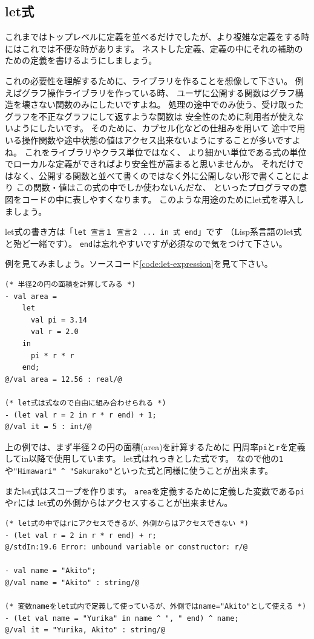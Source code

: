 \documentclass[11pt,a4paper]{article}
\begin{document}
\subsection{let式}
これまではトップレベルに定義を並べるだけでしたが、より複雑な定義をする時にはこれでは不便な時があります。
ネストした定義、定義の中にそれの補助のための定義を書けるようにしましょう。

これの必要性を理解するために、ライブラリを作ることを想像して下さい。
例えばグラフ操作ライブラリを作っている時、
ユーザに公開する関数はグラフ構造を壊さない関数のみにしたいですよね。
処理の途中でのみ使う、受け取ったグラフを不正なグラフにして返すような関数は
安全性のために利用者が使えないようにしたいです。
そのために、カプセル化などの仕組みを用いて
途中で用いる操作関数や途中状態の値はアクセス出来ないようにすることが多いですよね。
これをライブラリやクラス単位ではなく、
より細かい単位である式の単位でローカルな定義ができればより安全性が高まると思いませんか。
それだけではなく、公開する関数と並べて書くのではなく外に公開しない形で書くことにより
この関数・値はこの式の中でしか使わないんだな、
といったプログラマの意図をコードの中に表しやすくなります。
このような用途のためにlet式を導入しましょう。

let式の書き方は「\lstinline{let 宣言１ 宣言２ ... in 式 end}」です
（Lisp系言語のlet式と殆ど一緒です）。
\lstinline{end}は忘れやすいですが必須なので気をつけて下さい。

例を見てみましょう。ソースコード\ref{code:let-expression}を見て下さい。

\begin{lstlisting}[caption=let式,label=code:let-expression]
(* 半径2の円の面積を計算してみる *)
- val area =
    let
      val pi = 3.14
      val r = 2.0
    in
      pi * r * r
    end;
@/val area = 12.56 : real/@

(* let式は式なので自由に組み合わせられる *)
- (let val r = 2 in r * r end) + 1;
@/val it = 5 : int/@
\end{lstlisting}

上の例では、まず半径２の円の面積(area)を計算するために
円周率\lstinline{pi}と\lstinline{r}を定義してin以降で使用しています。
let式はれっきとした式です。
なので他の\lstinline{1}や\lstinline{"Himawari" ^ "Sakurako"}といった式と同様に使うことが出来ます。

またlet式はスコープを作ります。
\lstinline{area}を定義するために定義した変数である\lstinline{pi}や\lstinline{r}には
let式の外側からはアクセスすることが出来ません。

\begin{lstlisting}[caption=let式のスコープ,label=code:let-scope]
(* let式の中ではrにアクセスできるが、外側からはアクセスできない *)
- (let val r = 2 in r * r end) + r;
@/stdIn:19.6 Error: unbound variable or constructor: r/@

- val name = "Akito";
@/val name = "Akito" : string/@

(* 変数nameをlet式内で定義して使っているが、外側ではname="Akito"として使える *)
- (let val name = "Yurika" in name ^ ", " end) ^ name;
@/val it = "Yurika, Akito" : string/@
\end{lstlisting}
\end{document}
